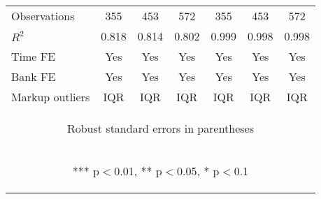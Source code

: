 \begin{tabular}{lcccccc}
Observations & 355 & 453 & 572 & 355 & 453 & 572 \\
$R^2$ & 0.818 & 0.814 & 0.802 & 0.999 & 0.998 & 0.998 \\
Time FE & Yes & Yes & Yes & Yes & Yes & Yes \\
Bank FE & Yes & Yes & Yes & Yes & Yes & Yes \\
 Markup outliers & IQR & IQR & IQR & IQR & IQR & IQR \\ \hline
\multicolumn{7}{c}{\begin{footnotesize} Robust standard errors in parentheses\end{footnotesize}} \\
\multicolumn{7}{c}{\begin{footnotesize} *** p$<$0.01, ** p$<$0.05, * p$<$0.1\end{footnotesize}} \\
\end{tabular}


